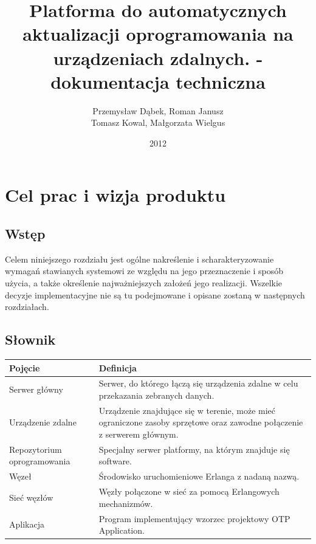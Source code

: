 \documentclass[polish,12pt]{aghthesis}
\author{Przemysław Dąbek, Roman Janusz\\ Tomasz Kowal, Małgorzata Wielgus}
\title{Platforma do automatycznych aktualizacji oprogramowania na urządzeniach zdalnych. - dokumentacja techniczna}
\date{2012}
\begin{document}
\maketitle





\section{Cel prac i wizja produktu}
\label{sec:cel-wizja}
\subsection{Wstęp}
Celem niniejszego rozdziału jest ogólne nakreślenie i scharakteryzowanie wymagań stawianych systemowi ze względu na jego przeznaczenie i sposób użycia, a także określenie najważniejszych założeń jego realizacji.
Wszelkie decyzje implementacyjne nie są tu podejmowane i opisane zostaną w następnych rozdziałach.
\subsection{Słownik}
\begin{tabular}{| l | p{9cm} |}
  \hline
  Pojęcie & Definicja \\ \hline
  Serwer główny & Serwer, do którego łączą się urządzenia zdalne w celu przekazania zebranych danych.\\ \hline
  Urządzenie zdalne & Urządzenie znajdujące się w terenie, może mieć ograniczone zasoby sprzętowe oraz zawodne połączenie z serwerem głównym.\\ \hline
  Repozytorium oprogramowania & Specjalny serwer platformy, na którym znajduje się software.\\ \hline
  Węzeł & Środowisko uruchomieniowe Erlanga z nadaną nazwą.\\ \hline
  Sieć węzłów & Węzły połączone w sieć za pomocą Erlangowych mechanizmów.\\ \hline
  Aplikacja & Program implementujący wzorzec projektowy OTP Application. \\ \hline
\end{tabular}
\end{document}
